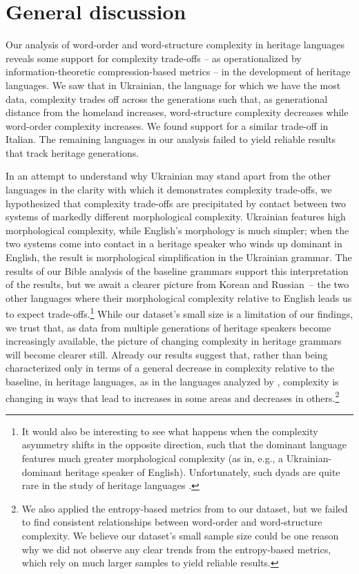 \documentclass[output=paper]{langscibook}
\begin{document}
\section{General discussion} \label{discussion}
\largerpage
Our analysis of word-order and word-structure complexity in heritage languages reveals some support for complexity trade-offs -- as operationalized by in\-for\-ma\-tion-the\-o\-ret\-ic compression-based metrics -- in the development of heritage languages. We saw that in Ukrainian, the language for which we have the most data, complexity trades off across the generations such that, as generational distance from the homeland increases, word-structure complexity decreases while word-order complexity increases. We found  support for a similar trade-off in Italian. The remaining languages in our analysis failed to yield reliable results that track heritage generations. 

\begin{sloppypar}
In an attempt to understand why Ukrainian may stand apart from the other languages in the clarity with which it demonstrates complexity trade-offs, we hypothesized that complexity trade-offs are precipitated by contact between two systems of markedly different morphological complexity. Ukrainian features high morphological complexity, while English's morphology is much simpler; when the two systems come into contact in a heritage speaker 
who winds up dominant in English, the result is morphological simplification in the Ukrainian grammar.
The results of our Bible analysis of the baseline grammars support this interpretation of the results, but we await a clearer picture from Korean and Russian~-- the two other languages where their morphological complexity relative to English leads us to expect trade-offs.\footnote{It would also be interesting to see what happens when the complexity asymmetry shifts in the opposite direction, such that the dominant language features much greater morphological complexity (as in, e.g., a Ukrainian-dominant heritage speaker of English). Unfortunately, such dyads are quite rare in the study of heritage languages \citep{ScontrasPutnam2020}.} 
While our dataset's small size is a limitation of our findings, we trust that, as data from multiple generations of heritage speakers become increasingly available, the picture of changing complexity in heritage grammars will become clearer still. Already our results suggest that, rather than being characterized only in terms of a general decrease in complexity relative to the baseline, in heritage languages, as in the languages analyzed by \citet{koplenig2017statistical}, complexity is changing in ways that lead to increases in some areas and decreases in others.\footnote{We also applied the entropy-based metrics from \citet{koplenig2017statistical} to our dataset, but we failed to find consistent relationships between word-order and word-structure complexity. We believe our dataset's small sample size could be one reason why we did not observe any clear trends from the entropy-based metrics, which rely on much larger samples to yield reliable results.}
\end{sloppypar}
\end{document}
